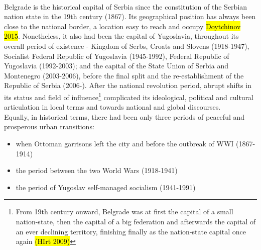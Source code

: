 \documentclass[11pt]{report}
\begin{document}
\\
Belgrade is the historical capital of Serbia since the constitution of the Serbian nation state in the 19th century (1867). Its geographical position has always been close to the national border, a location easy to reach and occupy \hl{Doytchinov 2015}.
Nonetheless, it also had been the capital of Yugoslavia, throughout its overall period of existence - Kingdom of Serbs, Croats and Slovens (1918-1947), Socialist Federal Republic of Yugoslavia (1945-1992), Federal Republic of Yugoslavia (1992-2003); and the capital of the State Union of Serbia and Montenegro (2003-2006), before the final split and the re-establishment of the Republic of Serbia (2006-). After the national revolution period, abrupt shifts in its status and field of influence\footnote{From 19th century onward, Belgrade was at first the capital of a small nation-state, then the capital of a big federation and afterwards the capital of an ever declining territory, finishing finally as the nation-state capital once again \hl{(HIrt 2009)}}
complicated its ideological, political and cultural articulation in local terms and towards national and global discourses.
\\
Equally, in historical terms, there had been only three periods of peaceful and prosperous urban transitions:

\begin{itemize}
\item when Ottoman garrisons left the city and before the outbreak of WWI (1867-1914)
\item the period between the two World Wars (1918-1941)
\item  the period of Yugoslav self-managed socialism (1941-1991)
\end{itemize}
\end{document}
